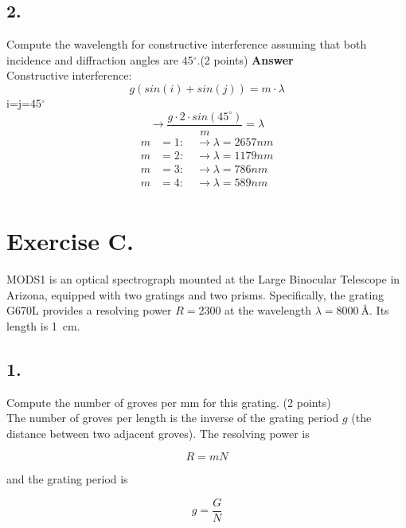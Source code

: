 \documentclass[11pt,a4paper,twoside]{article}
\begin{document}
\subsection*{2.}
Compute the wavelength for constructive interference assuming that both incidence and
diffraction angles are 45$^{\circ}$.(2 points)
\textbf{Answer}\\
Constructive interference:
\begin{equation}
g(sin(i)+sin(j))=m\cdot\lambda
\end{equation}
i=j=45$^{\circ}$
\begin{equation}
\rightarrow \frac{g\cdot 2\cdot sin(45^{\circ})}{m}=\lambda
\end{equation}
\begin{align*}
m&=1:\quad \rightarrow \lambda=2657nm\\
m&=2:\quad \rightarrow \lambda=1179nm\\
m&=3:\quad \rightarrow \lambda=786nm\\
m&=4:\quad \rightarrow \lambda=589nm\\
\end{align*}
%
\section*{Exercise C.}

MODS1 is an optical spectrograph mounted at the Large Binocular Telescope in 
Arizona, equipped with two gratings and two prisms. Specifically, the grating 
G670L provides a resolving power $R = \num{2300}$ at the wavelength 
$\lambda = \SI{8000}{\angstrom}$. Its length is \SI{1}{\cm}.

\subsection*{1.} Compute the number of groves per mm for this grating. (2 points) \\

The number of groves per length is the inverse of the grating period 
$g$ (the distance between two adjacent groves). The resolving power is 

\begin{equation}
 R = m N
 \label{eqn:resolving_power}
\end{equation}

and the grating period is 

\begin{equation}
 g = \frac{G}{N}
 \label{eqn:grating_period}
\end{equation}
\end{document}
